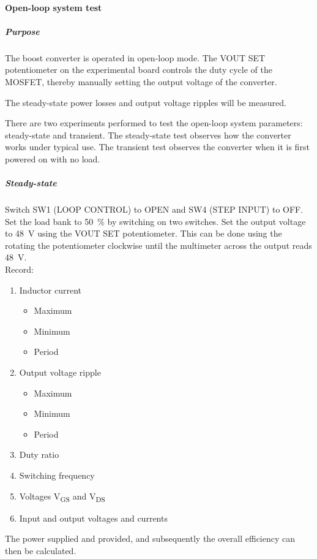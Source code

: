 \paragraph{Open-loop system test}
\subparagraph{Purpose}
The boost converter is operated in open-loop mode. The VOUT SET potentiometer on the experimental board
controls the duty cycle of the MOSFET, thereby manually setting the output voltage of the converter.

The steady-state power losses and output voltage ripples will be measured.

There are two experiments performed to test the open-loop system parameters: steady-state and transient.
The steady-state test observes how the converter works under typical use. The transient test observes
the converter when it is first powered on with no load.

\subparagraph{Steady-state}
Switch SW1 (LOOP CONTROL) to OPEN and SW4 (STEP INPUT) to OFF. Set the load bank to \qty{50}{\percent} by switching on two switches.
Set the output voltage to \qty{48}{\volt} using the VOUT SET potentiometer. This can be done using the rotating
the potentiometer clockwise until the multimeter across the output reads \qty{48}{\volt}.\\
Record:
\begin{enumerate}
    \item Inductor current
          \begin{itemize}
              \item Maximum
              \item Minimum
              \item Period
          \end{itemize}
    \item Output voltage ripple
          \begin{itemize}
              \item Maximum
              \item Minimum
              \item Period
          \end{itemize}
    \item Duty ratio
    \item Switching frequency
    \item Voltages V\textsubscript{GS} and V\textsubscript{DS}
    \item Input and output voltages and currents
\end{enumerate}
The power supplied and provided, and subsequently the overall efficiency can then be calculated.

